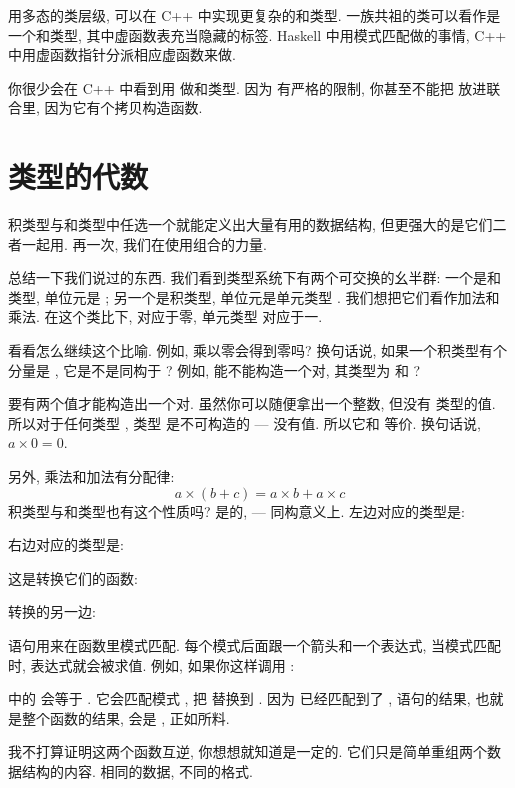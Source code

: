 用多态的类层级, 可以在 C++ 中实现更复杂的和类型. 一族共祖的类可以看作是一个和类型, 其中虚函数表充当隐藏的标签.
Haskell 中用模式匹配做的事情, C++ 中用虚函数指针分派相应虚函数来做.

你很少会在 C++ 中看到用  做和类型. 因为  有严格的限制, 你甚至不能把 
放进联合里, 因为它有个拷贝构造函数.

\section{类型的代数}

积类型与和类型中任选一个就能定义出大量有用的数据结构, 但更强大的是它们二者一起用. 再一次, 我们在使用组合的力量.

总结一下我们说过的东西. 我们看到类型系统下有两个可交换的幺半群: 一个是和类型, 单位元是 ; 另一个是积类型,
单位元是单元类型 \code{()}. 我们想把它们看作加法和乘法. 在这个类比下,  对应于零, 单元类型 \code{()}
对应于一.

看看怎么继续这个比喻. 例如, 乘以零会得到零吗? 换句话说, 如果一个积类型有个分量是 , 它是不是同构于 ?
例如, 能不能构造一个对, 其类型为  和 ?

要有两个值才能构造出一个对. 虽然你可以随便拿出一个整数, 但没有  类型的值. 所以对于任何类型 ,
类型  是不可构造的 --- 没有值. 所以它和  等价. 换句话说, $a \times 0 = 0$.

另外, 乘法和加法有分配律: \[a \times (b + c) = a \times b + a \times c\]
积类型与和类型也有这个性质吗? 是的, --- 同构意义上. 左边对应的类型是:

右边对应的类型是:

这是转换它们的函数:

转换的另一边:

 语句用来在函数里模式匹配. 每个模式后面跟一个箭头和一个表达式, 当模式匹配时, 表达式就会被求值.
例如, 如果你这样调用 :

 中的  会等于 . 它会匹配模式 , 把  替换到 .
因为  已经匹配到了 ,  语句的结果, 也就是整个函数的结果, 会是 ,
正如所料.

我不打算证明这两个函数互逆, 你想想就知道是一定的. 它们只是简单重组两个数据结构的内容. 相同的数据, 不同的格式.

